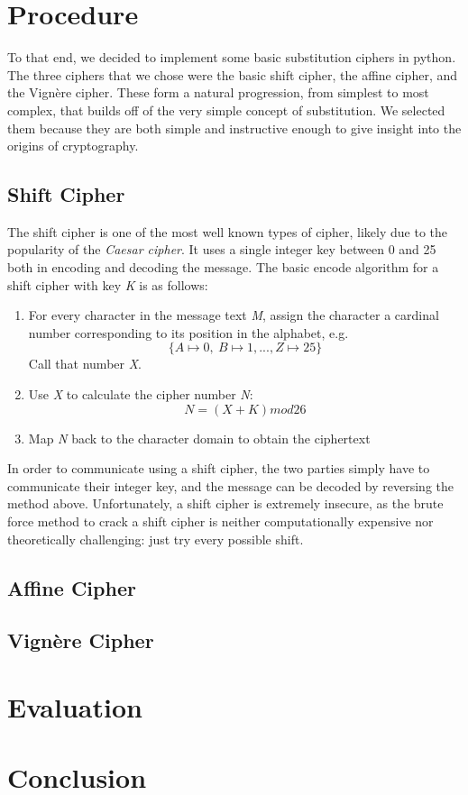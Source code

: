 \documentclass[11pt]{article}
\newcommand\tab{\hspace{4mm}}
\begin{document}
\section{Procedure}%
\tab	
To that end, we decided to implement some basic substitution ciphers in python. The three ciphers that we chose were the basic shift cipher, the affine cipher, and the Vign\`ere cipher.  These form a natural progression, from simplest to most complex, that builds off of the very simple concept of substitution.  We selected them because they are both simple and instructive enough to give insight into the origins of cryptography.
\subsection{Shift Cipher}
\tab
The shift cipher is one of the most well known types of cipher, likely due to the popularity of the \emph{Caesar cipher}.  It uses a single integer key between 0 and 25 both in encoding and decoding the message.  The basic encode algorithm for a shift cipher with key \emph{K} is as follows:

\begin{enumerate}
\item
For every character in the message text \emph{M}, assign the character a cardinal number corresponding to its position in the alphabet, e.g.
\begin{displaymath}
\{A \mapsto 0,\ B \mapsto 1, . . ., Z \mapsto 25\}
\end{displaymath}
Call that number \emph{X}.
\item
Use \emph{X} to calculate the cipher number \emph{N}:
\begin{displaymath}
N=( X + K ) mod 26
\end{displaymath}
\item
Map \emph{N} back to the character domain to obtain the ciphertext
\end{enumerate}
\tab
In order to communicate using a shift cipher, the two parties simply have to communicate their integer key, and the message can be decoded by reversing the method above.  Unfortunately, a shift cipher is extremely insecure, as the brute force method to crack a shift cipher is neither computationally expensive nor theoretically challenging: just try every possible shift. 
\subsection{Affine Cipher}

\subsection{Vign\`ere Cipher}
\section{Evaluation}

\section{Conclusion}


{}

\end{document}
